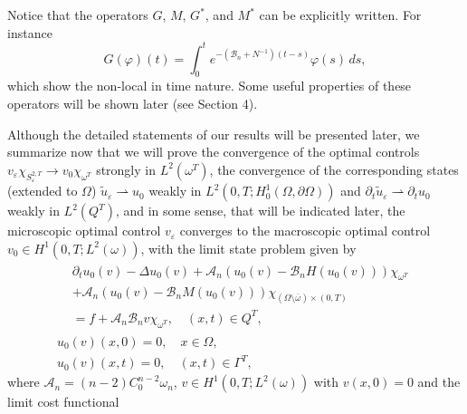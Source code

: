 \documentclass[10pt,a4paper]{amsart}
\numberwithin{equation}{section}
\begin{document}
Notice that the operators $G$, $M$, $G^{\ast }$, and $M^{\ast }$ can be
explicitly written. For instance
\[
G(\varphi )(t)=\int _0^{t}e^{-(\mathcal{B}_n+N^{-1})(t-s)}\varphi (s)\,ds,
\]
which show the non-local in time nature. Some useful properties of these
operators will be shown later (see Section 4).

Although the detailed statements of our results will be presented later, we
summarize now that we will prove the convergence of the optimal controls 
$v_{\varepsilon }\chi _{S_{\varepsilon }^{2,T}}\to v_0\chi
_{\omega ^{T}}$ strongly in $L^2(\omega ^{T})$, the convergence of the
corresponding states (extended to $\Omega $) 
$\tilde{u}_{\varepsilon }\rightharpoonup u_0$ weakly in
$L^2(0,T;H_0^{1}(\Omega ,\partial \Omega ))$ and
$\partial _{t}\tilde{u}_{\varepsilon }\rightharpoonup
\partial _{t}u_0$ weakly in $L^2(Q^{T})$, and in some sense, that will
be indicated later, the microscopic optimal control $v_{\varepsilon }$
converges to the macroscopic optimal control $v_0\in
H^{1}(0,T;L^2(\omega ))$, with the limit state problem given by
\begin{equation}
\begin{gathered}
\begin{aligned}
&\partial _{t}u_0(v)-\Delta u_0(v)+\mathcal{A}_n(u_0(v)-\mathcal{B}%
_nH(u_0(v)))\chi _{\omega ^{T}}  \\
&+\mathcal{A}_n(u_0(v)-\mathcal{B}_nM(u_0(v)))\chi _{(\Omega
\setminus \overline{\omega })\times (0,T)} \\
&=f+\mathcal{A}_n\mathcal{B}_nv\chi _{\omega ^{T}}, \quad (x,t)\in Q^{T},
\end{aligned}\\
u_0(v)(x,0)=0, \quad x\in \Omega , \\
u_0(v)(x,t)=0, \quad (x,t)\in \Gamma ^{T},
\end{gathered}
\end{equation}
where $\mathcal{A}_n = (n-2)C^{n-2}_0 \omega_n$, 
$v\in H^{1}(0,T;L^2(\omega ))$ with $v(x,0)=0$ and the limit cost
functional 
\end{document}
